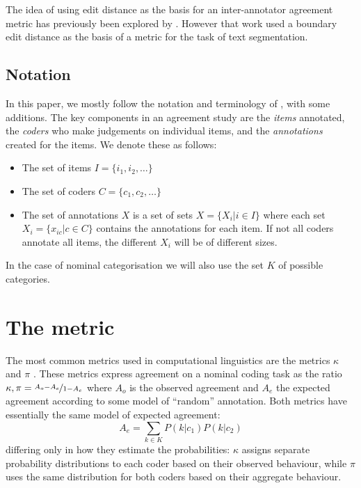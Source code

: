\documentclass[11pt]{article}
\makeatletter
\let\citeN=\newcite
\let\oldfrac=\frac
\renewcommand\frac[2]{\mathchoice{\oldfrac{#1}{#2}}{\nicefrac{#1}{#2}}{\nicefrac{#1}{#2}}{\nicefrac{#1}{#2}}}
\def\noparencite#1#2{{#1\if@tempswa , #2\fi}}
\newcommand\citeNP[1]{{\let\@cite=\noparencite\cite{#1}}}
\makeatother
\begin{document}
The idea of using edit distance as the basis for an inter-annotator agreement
metric has previously been explored by \citeN{Fournier13}. However that work
used a boundary edit distance as the basis of a metric for the task of text
segmentation.

\subsection{Notation}
\label{sec:notation}
In this paper, we mostly follow the notation and terminology of
\citeN{Art:Poe08}, with some additions. The key components in an agreement
study are the \emph{items} annotated, the \emph{coders} who make judgements on
individual items, and the \emph{annotations} created for the items. We denote
these as follows:
\begin{itemize}
    \item The set of items $I = \{i_1, i_2, \dots\}$
    \item The set of coders $C = \{c_1, c_2, \dots\}$
    \item The set of annotations $X$ is a set of sets $X = \{X_i | i\in I\}$
        where each set $X_i = \{x_{ic} | c\in C\}$ contains the annotations
        for each item. If not all coders annotate all items, the different
        $X_i$ will be of different sizes.
\end{itemize}
In the case of nominal categorisation we will also use the set $K$ of
possible categories.

\section{The metric}
\label{sec:metric}
The most common metrics used in computational linguistics are the metrics
$\kappa$ \cite[introduced to computational linguistics by
\citeNP{Carletta96}]{Cohen60} and $\pi$ \cite{Scott55}. These metrics express
agreement on a nominal coding task as the ratio $\kappa, \pi = \frac{A_o -
A_e}{1-A_e}$ where $A_o$ is the observed agreement and $A_e$ the expected
agreement according to some model of ``random'' annotation. Both metrics have
essentially the same model of expected agreement:
\begin{equation}
    A_e = \sum_{k\in K}P(k|c_1)P(k|c_2)
\end{equation}
differing only in how they estimate the probabilities: $\kappa$ assigns
separate probability distributions to each coder based on their observed
behaviour, while $\pi$ uses the same distribution for both coders based on
their aggregate behaviour.
\end{document}
